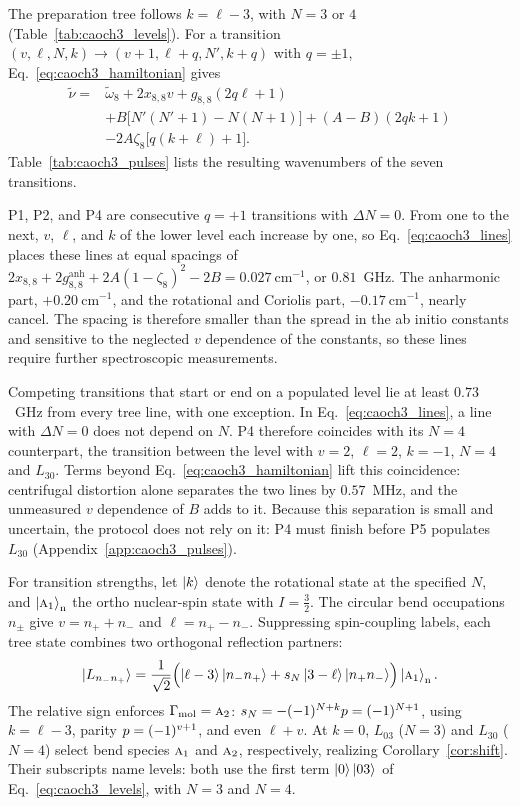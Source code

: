 The preparation tree follows $k=\ell-3$, with $N=3$ or $4$ (Table~\ref{tab:caoch3_levels}). For a transition $(v,\ell,N,k)\to(v+1,\ell+q,N',k+q)$ with $q=\pm1$, Eq.~\eqref{eq:caoch3_hamiltonian} gives
\begin{equation}
\begin{aligned}
\tilde\nu={}&\tilde\omega_8+2x_{8,8}v+g_{8,8}(2q\ell+1)\\
&+B\bigl[N'(N'+1)-N(N+1)\bigr]+(A-B)(2qk+1)\\
&-2A\zeta_8\bigl[q(k+\ell)+1\bigr].
\end{aligned}
\label{eq:caoch3_lines}
\end{equation}
Table~\ref{tab:caoch3_pulses} lists the resulting wavenumbers of the seven transitions.

P1, P2, and P4 are consecutive $q=+1$ transitions with $\Delta N=0$. From one to the next, $v$, $\ell$, and $k$ of the lower level each increase by one, so Eq.~\eqref{eq:caoch3_lines} places these lines at equal spacings of $2x_{8,8}+2g^{\mathrm{anh}}_{8,8}+2A(1-\zeta_8)^2-2B=0.027\ \mathrm{cm^{-1}}$, or $0.81$~GHz. The anharmonic part, $+0.20\ \mathrm{cm^{-1}}$, and the rotational and Coriolis part, $-0.17\ \mathrm{cm^{-1}}$, nearly cancel. The spacing is therefore smaller than the spread in the ab initio constants and sensitive to the neglected $v$ dependence of the constants, so these lines require further spectroscopic measurements.

Competing transitions that start or end on a populated level lie at least $0.73$~GHz from every tree line, with one exception. In Eq.~\eqref{eq:caoch3_lines}, a line with $\Delta N=0$ does not depend on $N$. P4 therefore coincides with its $N=4$ counterpart, the transition between the level with $v=2$, $\ell=2$, $k=-1$, $N=4$ and $L_{30}$. Terms beyond Eq.~\eqref{eq:caoch3_hamiltonian} lift this coincidence: centrifugal distortion alone separates the two lines by $0.57$~MHz, and the unmeasured $v$ dependence of $B$ adds to it. Because this separation is small and uncertain, the protocol does not rely on it: P4 must finish before P5 populates $L_{30}$ (Appendix~\ref{app:caoch3_pulses}).

For transition strengths, let $\ket{k}$ denote the rotational state at the specified $N$, and $\ket{\text{\normalfont\scshape a}_{1}}_{\mathrm n}$ the ortho nuclear-spin state with $I=\tfrac32$. The circular bend occupations $n_\pm$ give $v=n_++n_-$ and $\ell=n_+-n_-$. Suppressing spin-coupling labels, each tree state combines two orthogonal reflection partners:
\begin{equation}
\ket{L_{n_-n_+}}
=\frac{1}{\sqrt2}
\Bigl(
\ket{\ell-3}\lvert n_-n_+\rangle
+s_N\ket{3-\ell}\lvert n_+n_-\rangle
\Bigr)\ket{\text{\normalfont\scshape a}_{1}}_{\mathrm n}.
\label{eq:caoch3_levels}
\end{equation}
The relative sign enforces $\Gamma_{\mathrm{mol}}=\text{\normalfont\scshape a}_{2}$:
$s_N=-(-1)^{N+k}p=(-1)^{N+1}$, using $k=\ell-3$, parity $p=(-1)^{v+1}$, and even $\ell+v$.
At $k=0$, $L_{03}$ ($N=3$) and $L_{30}$ ($N=4$) select bend species $\text{\normalfont\scshape a}_{1}$ and $\text{\normalfont\scshape a}_{2}$, respectively, realizing Corollary~\ref{cor:shift}. Their subscripts name levels: both use the first term $\ket{0}\lvert 03\rangle$ of Eq.~\eqref{eq:caoch3_levels}, with $N=3$ and $N=4$.


